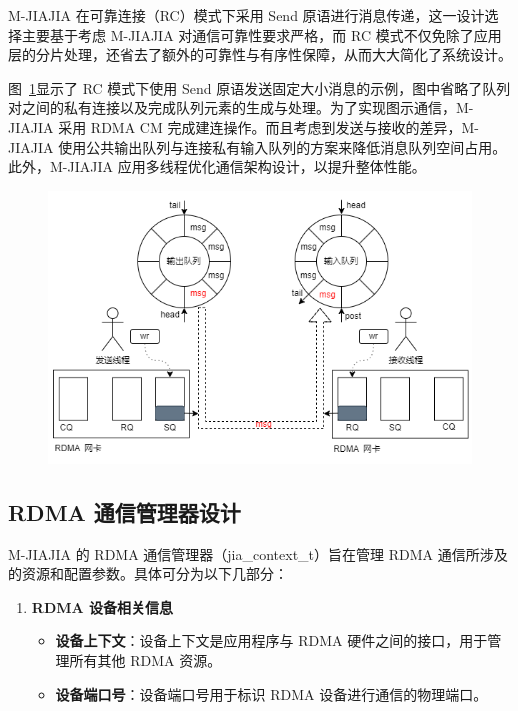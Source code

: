 {    M-JIAJIA 在可靠连接（RC）模式下采用 Send 原语进行消息传递，这一设计选择主要基于考虑
    M-JIAJIA 对通信可靠性要求严格，而 RC 模式不仅免除了应用层的分片处理，还省去了额外的可靠性与有序性保障，从而大大简化了系统设计。

    图~\ref{fig:mjiajia-send-recv}显示了 RC 模式下使用 Send 原语发送固定大小消息的示例，图中省略了队列对之间的私有连接以及完成队列元素的生成与处理。为了实现图示通信，M-JIAJIA 采用 RDMA CM 完成建连操作。而且考虑到发送与接收的差异，M-JIAJIA 使用公共输出队列与连接私有输入队列的方案来降低消息队列空间占用。此外，M-JIAJIA 应用多线程优化通信架构设计，以提升整体性能。
    \begin{figure}[H]
        \centering
        \includegraphics[width=\textwidth]{Img/RDMA-send-receive.png}
        \label{fig:mjiajia-send-recv}
    \end{figure}



    \subsection{RDMA 通信管理器设计}

    M-JIAJIA 的 RDMA 通信管理器（jia\_context\_t）旨在管理 RDMA 通信所涉及的资源和配置参数。具体可分为以下几部分：

    \begin{enumerate}[label=\arabic*., leftmargin=1em, align=left]
        \item \textbf{RDMA 设备相关信息}
              \begin{itemize}
                  \item \textbf{设备上下文}：设备上下文是应用程序与 RDMA 硬件之间的接口，用于管理所有其他 RDMA 资源。
                  \item \textbf{设备端口号}：设备端口号用于标识 RDMA 设备进行通信的物理端口。
              \end{itemize}


\end{enumerate}}

